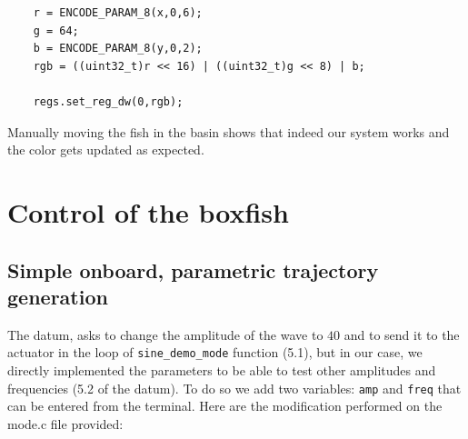 \documentclass[11pt]{article}
\begin{document}
\begin{verbatim}
    r = ENCODE_PARAM_8(x,0,6);
    g = 64;
    b = ENCODE_PARAM_8(y,0,2);
    rgb = ((uint32_t)r << 16) | ((uint32_t)g << 8) | b; 

    regs.set_reg_dw(0,rgb);
\end{verbatim}
Manually moving the fish in the basin shows that indeed our system works and the color gets updated as expected.

\section{Control of the boxfish}

\subsection{Simple onboard, parametric trajectory generation}

The datum, asks to change the amplitude of the wave to $40$ and to send it to the actuator in the loop of \texttt{sine\_demo\_mode} function (5.1), but in our case, we directly implemented the parameters to be able to test other amplitudes and frequencies (5.2 of the datum). To do so we add two variables: \texttt{amp} and \texttt{freq} that can be entered from the terminal. Here are the modification performed on the mode.c file provided:
\end{document}
